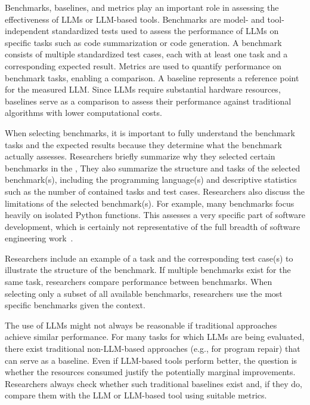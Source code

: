 
Benchmarks, baselines, and metrics play an important role in assessing the effectiveness of LLMs or LLM-based tools.
Benchmarks are model- and tool-independent standardized tests used to assess the performance of LLMs on specific tasks such as code summarization or code generation.
A benchmark consists of multiple standardized test cases, each with at least one task and a corresponding expected result.
Metrics are used to quantify performance on benchmark tasks, enabling a comparison.
A baseline represents a reference point for the measured LLM.
Since LLMs require substantial hardware resources, baselines serve as a comparison to assess their performance against traditional algorithms with lower computational costs.

When selecting benchmarks, it is important to fully understand the benchmark tasks and the expected results because they determine what the benchmark actually assesses.
Researchers \must briefly summarize why they selected certain benchmarks in the \paper, 
They \should also summarize the structure and tasks of the selected benchmark(s), including the programming language(s) and descriptive statistics such as the number of contained tasks and test cases.
Researchers \should also discuss the limitations of the selected benchmark(s).
For example, many benchmarks focus heavily on isolated Python functions.
This assesses a very specific part of software development, which is certainly not representative of the full breadth of software engineering work~\cite{Chandra2025benchmarks}.

Researchers \may include an example of a task and the corresponding test case(s) to illustrate the structure of the benchmark.
If multiple benchmarks exist for the same task, researchers \should compare performance between benchmarks.
When selecting only a subset of all available benchmarks, researchers \should use the most specific benchmarks given the context.

The use of LLMs might not always be reasonable if traditional approaches achieve similar performance. 
For many tasks for which LLMs are being evaluated, there exist traditional non-LLM-based approaches (e.g., for program repair) that can serve as a baseline.
Even if LLM-based tools perform better, the question is whether the resources consumed justify the potentially marginal improvements.
Researchers \should always check whether such traditional baselines exist and, if they do, compare them with the LLM or LLM-based tool using suitable metrics.

